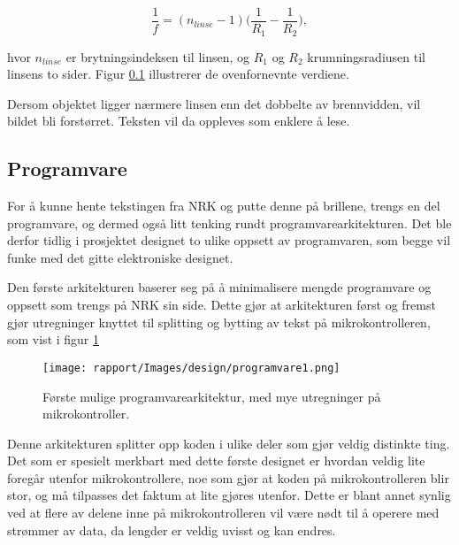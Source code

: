 \begin{equation}
    \frac{1}{f} = (n_{linse}-1)\Bigg( \frac{1}{R_1}-\frac{1}{R_2}\Bigg),
\end{equation}

hvor $n_{linse}$ er brytningsindeksen til linsen, og $R_1$ og $R_2$ krumningsradiusen til linsens to sider. Figur \ref{} illustrerer de ovenfornevnte verdiene. 


Dersom objektet ligger nærmere linsen enn det dobbelte av brennvidden, vil bildet bli forstørret. Teksten vil da oppleves som enklere å lese.

\iffalse
kilder:
http://hyperphysics.phy-astr.gsu.edu/hbase/geoopt/lenscon.html#c1
https://www.uio.no/studier/emner/matnat/fys/FYS2150/v19/kursmateriell/avbildning/avbildning.pdf
https://en.wikipedia.org/wiki/Mirror

\fi

\subsection{Programvare}

For å kunne hente tekstingen fra NRK og putte denne på brillene, trengs en del programvare, og dermed også litt tenking rundt programvarearkitekturen. Det ble derfor tidlig i prosjektet designet to ulike oppsett av programvaren, som begge vil funke med det gitte elektroniske designet.

Den første arkitekturen baserer seg på å minimalisere mengde programvare og oppsett som trengs på NRK sin side. Dette gjør at arkitekturen først og fremst gjør utregninger knyttet til splitting og bytting av tekst på mikrokontrolleren, som vist i figur \ref{fig:programvare1}

\begin{figure}[H]
    \centering
    \texttt{[image: rapport/Images/design/programvare1.png]}
    \caption{Første mulige programvarearkitektur, med mye utregninger på mikrokontroller.}
    \label{fig:programvare1}
\end{figure}

Denne arkitekturen splitter opp koden i ulike deler som gjør veldig distinkte ting. Det som er spesielt merkbart med dette første designet er hvordan veldig lite foregår utenfor mikrokontrollere, noe som gjør at koden på mikrokontrolleren blir stor, og må tilpasses det faktum at lite gjøres utenfor. Dette er blant annet synlig ved at flere av delene inne på mikrokontrolleren vil være nødt til å operere med strømmer av data, da lengder er veldig uvisst og kan endres.

